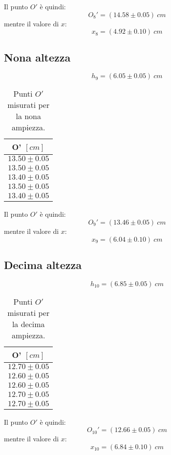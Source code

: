 Il punto $O'$ è quindi:
\begin{equation}
	O_8'=(14.58\pm0.05)\ cm
\end{equation}
mentre il valore di $x$:
\begin{equation}
	x_8=(4.92\pm 0.10)\ cm
\end{equation}

\subsection{Nona altezza}
\begin{equation}
	h_9=(6.05\pm0.05)\ cm
\end{equation}

\begin{table}[H]
	\centering
	\begin{tabular}{|c|}
		\hline
		\textbf{O' $[cm]$} \\
		\hline
		$13.50\pm 0.05$ \\
		$13.50\pm 0.05$ \\
		$13.40\pm 0.05$ \\
		$13.50\pm 0.05$ \\
		$13.40\pm 0.05$ \\
		\hline
	\end{tabular}
	\caption{Punti $O'$ misurati per la nona ampiezza.}
	\label{tab:}
\end{table}

Il punto $O'$ è quindi:
\begin{equation}
	O_9'=(13.46\pm0.05)\ cm
\end{equation}
mentre il valore di $x$:
\begin{equation}
	x_9=(6.04\pm 0.10)\ cm
\end{equation}

\subsection{Decima altezza}
\begin{equation}
	h_10=(6.85\pm0.05)\ cm
\end{equation}

\begin{table}[H]
	\centering
	\begin{tabular}{|c|}
		\hline
		\textbf{O' $[cm]$} \\
		\hline
		$12.70\pm 0.05$ \\
		$12.60\pm 0.05$ \\
		$12.60\pm 0.05$ \\
		$12.70\pm 0.05$ \\
		$12.70\pm 0.05$ \\
		\hline
	\end{tabular}
	\caption{Punti $O'$ misurati per la decima ampiezza.}
	\label{tab:}
\end{table}

Il punto $O'$ è quindi:
\begin{equation}
	O_{10}'=(12.66\pm0.05)\ cm
\end{equation}
mentre il valore di $x$:
\begin{equation}
	x_{10}=(6.84\pm 0.10)\ cm
\end{equation}
 
